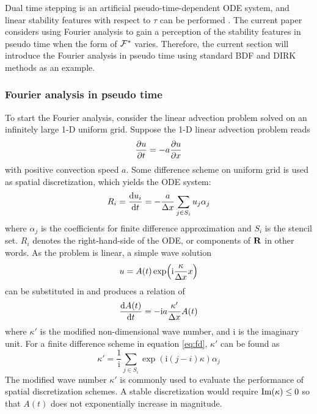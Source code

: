 \documentclass[preprint,12pt]{elsarticle}
\begin{document}
Dual time stepping  is an artificial 
pseudo-time-dependent ODE system, and linear stability features with 
respect to $\tau$ can be performed \cite{jameson1991time}. 
The current paper considers using Fourier analysis 
to gain a perception of the stability features in pseudo time 
when the form of $\mathcal{F}^*$ varies. 
Therefore, the current section will introduce the 
Fourier analysis in pseudo time using standard BDF and DIRK 
methods as an example. 


\subsubsection{Fourier analysis in pseudo time}
\label{sssec:fourier}

\newcommand{\imagUnit}{\mathrm{i}}

To start the Fourier analysis, consider the linear advection problem
solved on an infinitely large 1-D uniform
grid.
Suppose the 1-D linear advection problem reads
\begin{equation}
    \partialderivative{u}{t} = -a \partialderivative{u}{x}
\end{equation}
with positive convection speed $a$.
Some difference scheme on uniform grid is used as spatial  discretization, which 
yields the ODE system:
\begin{equation}
    R_i=\derivative{u_i}{t} = -\frac{a}{\inc x} \sum_{j\in S_i}u_j\alpha_j
    \label{eq:fd}
\end{equation}
where $\alpha_j$ is the coefficients for finite difference approximation
and $S_i$ is the stencil set. $R_i$ denotes the right-hand-side of the ODE, 
or components of $\mathbf{R}$ in other words.
As the problem is linear,
a simple wave solution
\begin{equation}
    u = A(t)\exp(\imagUnit \frac{\kappa}{\inc x} x)
\end{equation}
can be substituted in and produces
a relation of
\begin{equation}
    \frac{\dd A(t)}{\dd t} = -\imagUnit a\frac{\kappa'}{\inc x}  A(t)
\end{equation}
where $\kappa'$ is the modified non-dimensional wave number,
and $\imagUnit$ is the imaginary unit.
For a finite difference scheme in equation \eqref{eq:fd},
$\kappa'$ can be found as
\begin{equation}
    \kappa' = \frac{1}{\imagUnit} \sum_{j\in S_i}\exp(\imagUnit (j-i)\kappa)\alpha_j
\end{equation}
The modified wave number $\kappa'$ is commonly used to evaluate the performance of
spatial  discretization schemes.
A stable discretization would require $\mathrm{Im}(\kappa) \leq 0$ so that
$A(t)$ does not exponentially increase in magnitude.
\end{document}

